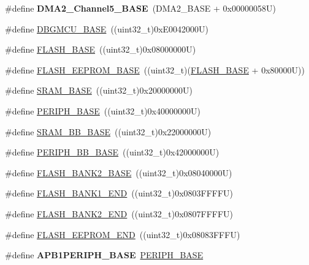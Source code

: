 \begin{DoxyCompactItemize}
\item 
\hypertarget{group___peripheral__memory__map_ga1eea983a5d68bf36f4d19fbb07955ca1}{\#define {\bfseries D\-M\-A2\-\_\-\-Channel5\-\_\-\-B\-A\-S\-E}~(D\-M\-A2\-\_\-\-B\-A\-S\-E + 0x00000058\-U)}\label{group___peripheral__memory__map_ga1eea983a5d68bf36f4d19fbb07955ca1}

\item 
\#define \hyperlink{group___peripheral__memory__map_ga4adaf4fd82ccc3a538f1f27a70cdbbef}{D\-B\-G\-M\-C\-U\-\_\-\-B\-A\-S\-E}~((uint32\-\_\-t)0x\-E0042000\-U)
\item 
\#define \hyperlink{group___peripheral__memory__map_ga23a9099a5f8fc9c6e253c0eecb2be8db}{F\-L\-A\-S\-H\-\_\-\-B\-A\-S\-E}~((uint32\-\_\-t)0x08000000\-U)
\item 
\#define \hyperlink{group___peripheral__memory__map_ga45b9071c81cb72a66e2e3195343fcb3a}{F\-L\-A\-S\-H\-\_\-\-E\-E\-P\-R\-O\-M\-\_\-\-B\-A\-S\-E}~((uint32\-\_\-t)(\hyperlink{group___peripheral__memory__map_ga23a9099a5f8fc9c6e253c0eecb2be8db}{F\-L\-A\-S\-H\-\_\-\-B\-A\-S\-E} + 0x80000\-U))
\item 
\#define \hyperlink{group___peripheral__memory__map_ga05e8f3d2e5868754a7cd88614955aecc}{S\-R\-A\-M\-\_\-\-B\-A\-S\-E}~((uint32\-\_\-t)0x20000000\-U)
\item 
\#define \hyperlink{group___peripheral__memory__map_ga9171f49478fa86d932f89e78e73b88b0}{P\-E\-R\-I\-P\-H\-\_\-\-B\-A\-S\-E}~((uint32\-\_\-t)0x40000000\-U)
\item 
\#define \hyperlink{group___peripheral__memory__map_gad3548b6e2f017f39d399358f3ac98454}{S\-R\-A\-M\-\_\-\-B\-B\-\_\-\-B\-A\-S\-E}~((uint32\-\_\-t)0x22000000\-U)
\item 
\#define \hyperlink{group___peripheral__memory__map_gaed7efc100877000845c236ccdc9e144a}{P\-E\-R\-I\-P\-H\-\_\-\-B\-B\-\_\-\-B\-A\-S\-E}~((uint32\-\_\-t)0x42000000\-U)
\item 
\#define \hyperlink{group___peripheral__memory__map_ga289057b052162696849fef25b656d3d9}{F\-L\-A\-S\-H\-\_\-\-B\-A\-N\-K2\-\_\-\-B\-A\-S\-E}~((uint32\-\_\-t)0x08040000\-U)
\item 
\#define \hyperlink{group___peripheral__memory__map_ga443a2786535d83e32dfdc2b29e379332}{F\-L\-A\-S\-H\-\_\-\-B\-A\-N\-K1\-\_\-\-E\-N\-D}~((uint32\-\_\-t)0x0803\-F\-F\-F\-F\-U)
\item 
\#define \hyperlink{group___peripheral__memory__map_gab24a21b645aaab8737af5603c3d11e71}{F\-L\-A\-S\-H\-\_\-\-B\-A\-N\-K2\-\_\-\-E\-N\-D}~((uint32\-\_\-t)0x0807\-F\-F\-F\-F\-U)
\item 
\#define \hyperlink{group___peripheral__memory__map_gac8cb9b66893a7c4bdff3258909af027a}{F\-L\-A\-S\-H\-\_\-\-E\-E\-P\-R\-O\-M\-\_\-\-E\-N\-D}~((uint32\-\_\-t)0x08083\-F\-F\-F\-U)
\item 
\hypertarget{group___peripheral__memory__map_ga45666d911f39addd4c8c0a0ac3388cfb}{\#define {\bfseries A\-P\-B1\-P\-E\-R\-I\-P\-H\-\_\-\-B\-A\-S\-E}~\hyperlink{group___peripheral__memory__map_ga9171f49478fa86d932f89e78e73b88b0}{P\-E\-R\-I\-P\-H\-\_\-\-B\-A\-S\-E}}\label{group___peripheral__memory__map_ga45666d911f39addd4c8c0a0ac3388cfb}


\end{DoxyCompactItemize}
